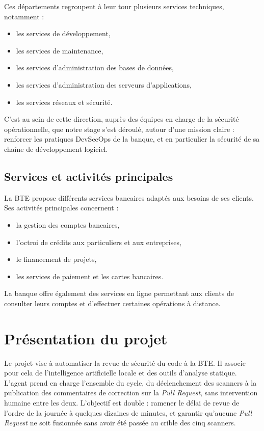         Ces départements regroupent à leur tour plusieurs services techniques,
        notamment :
        \begin{itemize}
            \item les services de développement,
            \item les services de maintenance,
            \item les services d'administration des bases de données,
            \item les services d'administration des serveurs d'applications,
            \item les services réseaux et sécurité.
        \end{itemize}

        C'est au sein de cette direction, auprès des équipes en charge de la sécurité
        opérationnelle, que notre stage s'est déroulé, autour d'une mission claire :
        renforcer les pratiques DevSecOps de la banque, et en particulier la sécurité
        de sa chaîne de développement logiciel.

    \subsection{Services et activités principales}

        La BTE propose différents services bancaires adaptés aux besoins de ses clients.
        Ses activités principales concernent :
        \begin{itemize}
            \item la gestion des comptes bancaires,
            \item l'octroi de crédits aux particuliers et aux entreprises,
            \item le financement de projets,
            \item les services de paiement et les cartes bancaires.
        \end{itemize}

        La banque offre également des services en ligne permettant aux clients de
        consulter leurs comptes et d'effectuer certaines opérations à distance.

\section{Présentation du projet}

    Le projet vise à automatiser la revue de sécurité du code à la BTE. Il associe
    pour cela de l'intelligence artificielle locale et des outils d'analyse statique. L'agent
    prend en charge l'ensemble du cycle, du déclenchement des scanners à la publication
    des commentaires de correction sur la \textit{Pull Request}, sans intervention
    humaine entre les deux. L'objectif est double : ramener le délai de revue de
    l'ordre de la journée à quelques dizaines de minutes, et garantir qu'aucune
    \textit{Pull Request} ne soit fusionnée sans avoir été passée au crible des
    cinq scanners.

